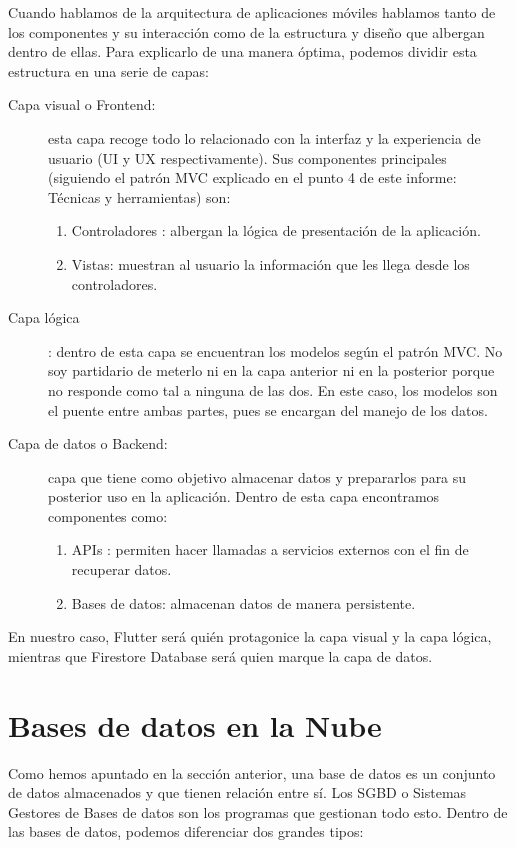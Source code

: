 	Cuando hablamos de la arquitectura de aplicaciones móviles hablamos tanto de los componentes y su interacción como de la estructura y diseño que albergan dentro de ellas. Para explicarlo de una manera óptima, podemos dividir esta estructura en una serie de capas:
	
	\begin{description}
		\item[Capa visual o Frontend:] esta capa recoge todo lo relacionado con la interfaz y la experiencia de usuario (UI y UX respectivamente). Sus componentes principales (siguiendo el patrón MVC explicado en el punto 4 de este informe: Técnicas y herramientas) son:
			\begin{enumerate}
				\item Controladores : albergan la lógica de presentación de la aplicación.
				\item Vistas: muestran al usuario la información que les llega desde los controladores.
			\end{enumerate}
		\item[Capa lógica]: dentro de esta capa se encuentran los modelos según el patrón MVC. No soy partidario de meterlo ni en la capa anterior ni en la posterior porque no responde como tal a ninguna de las dos. En este caso, los modelos son el puente entre ambas partes, pues se encargan del manejo de los datos.
		\item[Capa de datos o Backend:] capa que tiene como objetivo almacenar datos y prepararlos para su posterior uso en la aplicación. Dentro de esta capa encontramos componentes como:
			\begin{enumerate}
				\item APIs : permiten hacer llamadas a servicios externos con el fin de recuperar datos.
				\item Bases de datos: almacenan datos de manera persistente.
			\end{enumerate}
	\end{description}
	
	En nuestro caso, Flutter será quién protagonice la capa visual y la capa lógica, mientras que Firestore Database será quien marque la capa de datos.
	
\section{Bases de datos en la Nube}

	Como hemos apuntado en la sección anterior, una base de datos es un conjunto de datos almacenados y que tienen relación entre sí. Los SGBD o Sistemas Gestores de Bases de datos son los programas que gestionan todo esto. Dentro de las bases de datos, podemos diferenciar dos grandes tipos:
	
